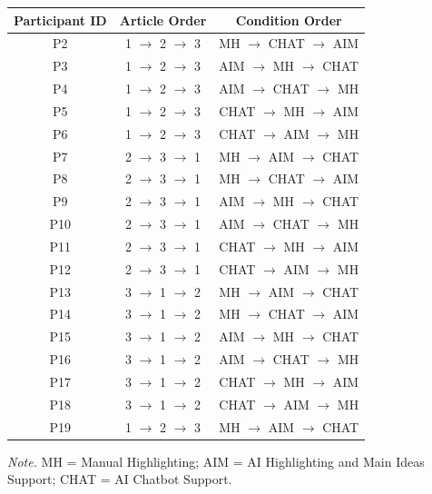\documentclass{IEEEtran}
\begin{document}
\begin{table}[H]
\begin{tabular}{c c c}
\hline
Participant ID & Article Order & Condition Order \\
\hline
P2  & 1 $\rightarrow$ 2 $\rightarrow$ 3 & MH $\rightarrow$ CHAT $\rightarrow$ AIM \\
P3  & 1 $\rightarrow$ 2 $\rightarrow$ 3 & AIM $\rightarrow$ MH $\rightarrow$ CHAT \\
P4  & 1 $\rightarrow$ 2 $\rightarrow$ 3 & AIM $\rightarrow$ CHAT $\rightarrow$ MH \\
P5  & 1 $\rightarrow$ 2 $\rightarrow$ 3 & CHAT $\rightarrow$ MH $\rightarrow$ AIM \\
P6  & 1 $\rightarrow$ 2 $\rightarrow$ 3 & CHAT $\rightarrow$ AIM $\rightarrow$ MH \\
P7  & 2 $\rightarrow$ 3 $\rightarrow$ 1 & MH $\rightarrow$ AIM $\rightarrow$ CHAT \\
P8  & 2 $\rightarrow$ 3 $\rightarrow$ 1 & MH $\rightarrow$ CHAT $\rightarrow$ AIM \\
P9  & 2 $\rightarrow$ 3 $\rightarrow$ 1 & AIM $\rightarrow$ MH $\rightarrow$ CHAT \\
P10 & 2 $\rightarrow$ 3 $\rightarrow$ 1 & AIM $\rightarrow$ CHAT $\rightarrow$ MH \\
P11 & 2 $\rightarrow$ 3 $\rightarrow$ 1 & CHAT $\rightarrow$ MH $\rightarrow$ AIM \\
P12 & 2 $\rightarrow$ 3 $\rightarrow$ 1 & CHAT $\rightarrow$ AIM $\rightarrow$ MH \\
P13 & 3 $\rightarrow$ 1 $\rightarrow$ 2 & MH $\rightarrow$ AIM $\rightarrow$ CHAT \\
P14 & 3 $\rightarrow$ 1 $\rightarrow$ 2 & MH $\rightarrow$ CHAT $\rightarrow$ AIM \\
P15 & 3 $\rightarrow$ 1 $\rightarrow$ 2 & AIM $\rightarrow$ MH $\rightarrow$ CHAT \\
P16 & 3 $\rightarrow$ 1 $\rightarrow$ 2 & AIM $\rightarrow$ CHAT $\rightarrow$ MH \\
P17 & 3 $\rightarrow$ 1 $\rightarrow$ 2 & CHAT $\rightarrow$ MH $\rightarrow$ AIM \\
P18 & 3 $\rightarrow$ 1 $\rightarrow$ 2 & CHAT $\rightarrow$ AIM $\rightarrow$ MH \\
P19 & 1 $\rightarrow$ 2 $\rightarrow$ 3 & MH $\rightarrow$ AIM $\rightarrow$ CHAT \\
\hline
\end{tabular}

\vspace{1mm}
\begin{minipage}{0.95\columnwidth}
\scriptsize
\raggedright
\textit{Note.} MH = Manual Highlighting; AIM = AI Highlighting and Main Ideas Support; CHAT = AI Chatbot Support.
\end{minipage}

\end{table}
\end{document}
